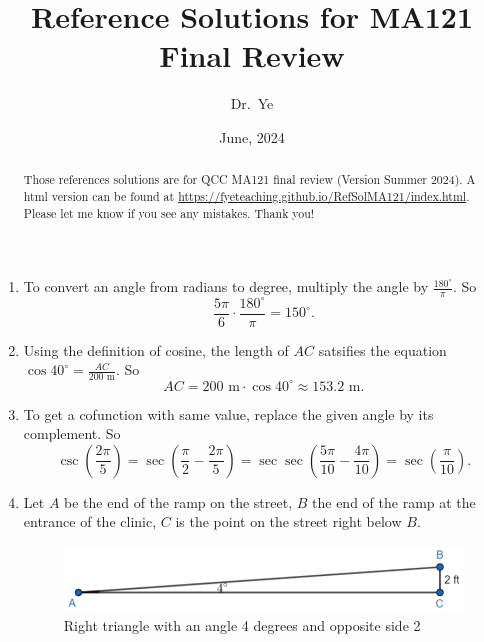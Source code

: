 \documentclass[
  12pt]{article}
\title{Reference Solutions for MA121 Final Review}
\author{Dr.~Ye}
\date{June, 2024}
\begin{document}
\maketitle
\begin{abstract}
Those references solutions are for QCC MA121 final review (Version
Summer 2024). A html version can be found at
\url{https://fyeteaching.github.io/RefSolMA121/index.html}. Please let
me know if you see any mistakes. Thank you!
\end{abstract}

\begin{enumerate}
\def\labelenumi{\arabic{enumi}.}
\item
  To convert an angle from radians to degree, multiply the angle by
  \(\frac{180^\circ}{\pi}\). So
  \[\frac{5\pi}{6}\cdot\frac{180^\circ}{\pi}=150^\circ.\]
\item
  Using the definition of cosine, the length of \(AC\) satsifies the
  equation \(\cos 40^\circ=\frac{AC}{200 \text{ m}}\). So
  \[AC=200 \text{ m} \cdot \cos 40^\circ \approx 153.2 \text{ m}.\]
\item
  To get a cofunction with same value, replace the given angle by its
  complement. So
  \[\csc\left(\dfrac{2\pi}{5}\right)=\sec\left(\frac{\pi}{2}-\frac{2\pi}{5}\right)=\sec\sec\left(\frac{5\pi}{10}-\frac{4\pi}{10}\right)=\sec\left(\frac{\pi}{10}\right).\]
\item
  Let \(A\) be the end of the ramp on the street, \(B\) the end of the
  ramp at the entrance of the clinic, \(C\) is the point on the street
  right below \(B\).

  \begin{figure}[H]

  {\centering \includegraphics{Q4.jpeg}

  }

  \caption{Right triangle with an angle 4 degrees and opposite side 2}

  \end{figure}%


\end{enumerate}
\end{document}
